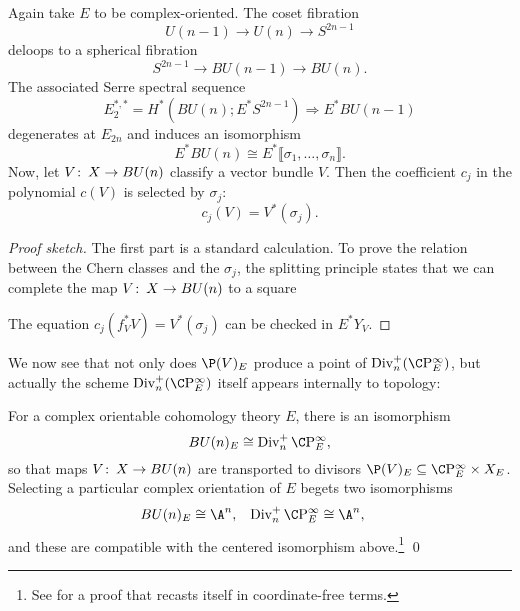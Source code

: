 \begin{theorem}\label{ChernClassesAreSymmInChernRoots}
Again take \(E\) to be complex-oriented.  The coset fibration \[U(n-1) \to U(n) \to S^{2n-1}\] deloops to a spherical fibration \[S^{2n-1} \to BU(n-1) \to BU(n).\]  The associated Serre spectral sequence \[E_2^{*, *} = H^*(BU(n); E^* S^{2n-1}) \Rightarrow E^* BU(n-1)\] degenerates at \(E_{2n}\) and induces an isomorphism \[E^* BU(n) \cong E^* \llbracket \sigma_1, \ldots, \sigma_n\rrbracket.\]  Now, let \(V\colon\thinspace X \to BU(n)\) classify a vector bundle \(V\).  Then the coefficient \(c_j\) in the polynomial \(c(V)\) is selected by \(\sigma_j\): \[c_j(V) = V^*(\sigma_j).\]
\end{theorem}
\begin{proof}[Proof sketch]
The first part is a standard calculation.  To prove the relation between the Chern classes and the \(\sigma_j\), the splitting principle states that we can complete the map \(V\colon\thinspace X \to BU(n)\) to a square
\begin{center}
\end{center}
The equation \(c_j(f_V^* V) = V^*(\sigma_j)\) can be checked in \(E^* Y_V\).
\end{proof}

We now see that not only does \(\P(V)_E\) produce a point of \(\Div_n^+(\CP^\infty_E)\), but actually the scheme \(\Div_n^+(\CP^\infty_E)\) itself appears internally to topology:

\begin{corollary}\label{IdentificationOfBUnWithDivn}
For a complex orientable cohomology theory \(E\), there is an isomorphism \[BU(n)_E \cong \Div_n^+ \CP^\infty_E,\] so that maps \(V\colon\thinspace X \to BU(n)\) are transported to divisors \(\P(V)_E \subseteq \CP^\infty_E \times X_E\).  Selecting a particular complex orientation of \(E\) begets two isomorphisms
\begin{align*}
BU(n)_E & \cong \A^n, &
\Div_n^+ \CP^\infty_E & \cong \A^n,
\end{align*}
and these are compatible with the centered isomorphism above.\footnote{See \cite[Proposition 8.31]{StricklandFSFG} for a proof that recasts  itself in coordinate-free terms.} \qed
\end{corollary}

